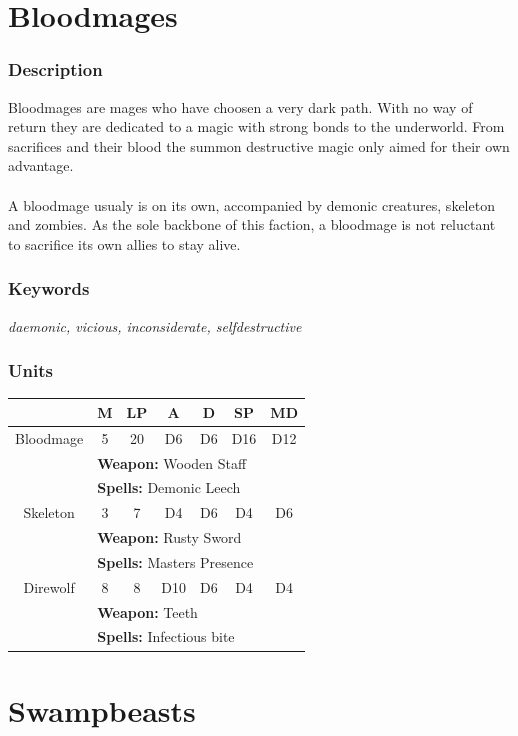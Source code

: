 \documentclass[a5paper,pagesize,10pt,bibtotoc,pointlessnumbers,
normalheadings,DIV=9,twoside=false]{scrbook}
\begin{document}
\newpage
\section{Bloodmages}

\subsubsection{Description}
Bloodmages are mages who have choosen a very dark path. With no way of return they are dedicated to a magic with strong bonds to the underworld.
From sacrifices and their blood the summon destructive magic only aimed for their own advantage.\\
\\
A bloodmage usualy is on its own, accompanied by demonic creatures, skeleton and zombies. As the sole backbone of this faction, a bloodmage is not reluctant to sacrifice its own allies to stay alive.

\subsubsection{Keywords}
\emph{daemonic, vicious, inconsiderate, selfdestructive}

\subsubsection{Units}
 \begin{tabular}{||c c c c c c c||} 
 \hline
  & M & LP & A & D & SP & MD \\
 \hline\hline
 Bloodmage & 5 & 20 & D6 & D6 & D16 & D12 \\ 
  & \multicolumn{6}{l||}{\textbf{Weapon:} Wooden Staff} \\
  & \multicolumn{6}{l||}{\textbf{Spells:} Demonic Leech} \\
 \hline
 Skeleton & 3 & 7 & D4 & D6 & D4 & D6 \\
  & \multicolumn{6}{l||}{\textbf{Weapon:} Rusty Sword} \\
  & \multicolumn{6}{l||}{\textbf{Spells:} Masters Presence} \\
\hline
 Direwolf & 8 & 8 & D10 & D6 & D4 & D4 \\
  & \multicolumn{6}{l||}{\textbf{Weapon:} Teeth} \\
  & \multicolumn{6}{l||}{\textbf{Spells:} Infectious bite} \\
\hline
\end{tabular}

\newpage
\section{Swampbeasts}
\end{document}
